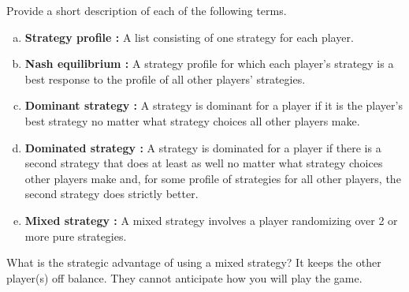 \documentclass[a4paper,12pt]{article}
\begin{document}
Provide a short description of each of the following terms.
\begin{enumerate}[(a)]
\item \textbf{ Strategy profile :} A list consisting of one strategy for each player. 
\item \textbf{ Nash equilibrium :} A strategy profile for which each player's strategy is a best response to
the profile of all other players' strategies. 
\item \textbf{ Dominant strategy :} A strategy is dominant for a player if it is the player's best strategy
no matter what strategy choices all other players make. 
\item \textbf{ Dominated strategy :} A strategy is dominated for a player if there is a second strategy that
does at least as well no matter what strategy choices other players make and, for some
profile of strategies for all other players, the second strategy does strictly better. 
\item \textbf{ Mixed strategy :} A mixed strategy involves a player randomizing over 2 or more pure
strategies. 
\end{enumerate}
What is the strategic advantage of using a mixed strategy?
It keeps the other player(s) off balance. They cannot anticipate how you will play the
game. 
\end{document}
